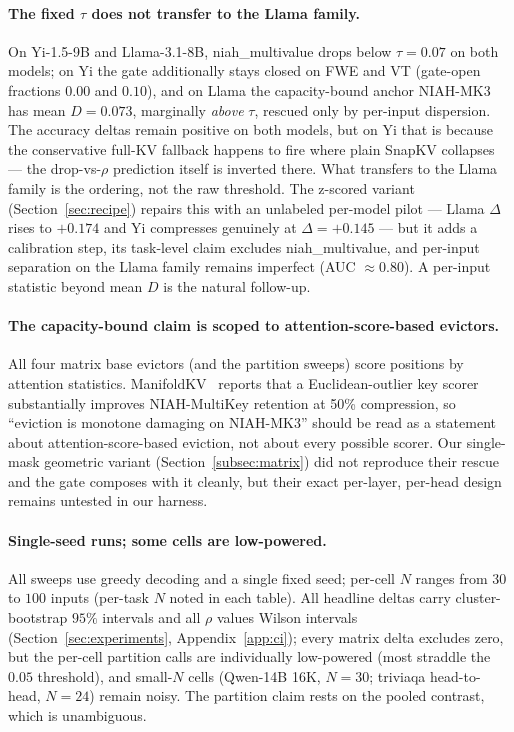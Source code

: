 \documentclass{article}
\begin{document}
\paragraph{The fixed $\tau$ does not transfer to the Llama family.} On
Yi-1.5-9B and Llama-3.1-8B, niah\_multivalue drops below $\tau = 0.07$
on both models; on Yi the gate additionally stays closed on FWE and VT
(gate-open fractions $0.00$ and $0.10$), and on Llama the
capacity-bound anchor NIAH-MK3 has mean $D = 0.073$, marginally
\emph{above} $\tau$, rescued only by per-input dispersion. The
accuracy deltas remain positive on both models, but on Yi that is
because the conservative full-KV fallback happens to fire where plain
SnapKV collapses --- the drop-vs-$\rho$ prediction itself is inverted
there. What transfers to the Llama family is the ordering, not the raw
threshold. The z-scored variant (Section~\ref{sec:recipe}) repairs
this with an unlabeled per-model pilot --- Llama $\Delta$ rises to
$+0.174$ and Yi compresses genuinely at $\Delta = +0.145$ --- but it
adds a calibration step, its task-level claim excludes
niah\_multivalue, and per-input separation on the Llama family remains
imperfect (AUC $\approx 0.80$). A per-input statistic beyond mean $D$
is the natural follow-up.

\paragraph{The capacity-bound claim is scoped to attention-score-based
evictors.} All four matrix base evictors (and the partition sweeps)
score positions by attention statistics.
ManifoldKV~\citep{arxiv260208343} reports that a Euclidean-outlier key
scorer substantially improves NIAH-MultiKey retention at 50\%
compression, so ``eviction is monotone damaging on NIAH-MK3'' should
be read as a statement about attention-score-based eviction, not about
every possible scorer. Our single-mask geometric variant
(Section~\ref{subsec:matrix}) did not reproduce their rescue and the
gate composes with it cleanly, but their exact per-layer, per-head
design remains untested in our harness.

\paragraph{Single-seed runs; some cells are low-powered.} All sweeps
use greedy decoding and a single fixed seed; per-cell $N$ ranges from
$30$ to $100$ inputs (per-task $N$ noted in each table). All headline
deltas carry cluster-bootstrap $95\%$ intervals and all $\rho$ values
Wilson intervals (Section~\ref{sec:experiments},
Appendix~\ref{app:ci}); every matrix delta excludes zero, but the
per-cell partition calls are individually low-powered (most straddle
the $0.05$ threshold), and small-$N$ cells (Qwen-14B 16K, $N = 30$;
triviaqa head-to-head, $N = 24$) remain noisy. The partition claim
rests on the pooled contrast, which is unambiguous.
\end{document}
